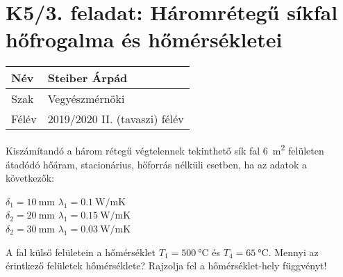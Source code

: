 
\section*{K5/3. feladat: Háromrétegű síkfal hőfrogalma és hőmérsékletei}

\begin{tabular}{ | p{2cm} | p{14cm} | } 
	\hline
	Név & Steiber Árpád \\ 
	\hline
	Szak & Vegyészmérnöki \\ 
	\hline
	Félév & 2019/2020 II. (tavaszi) félév \\ 
	\hline
\end{tabular}
\vspace{0.5cm}

\noindent Kiszámítandó a három rétegű végtelennek tekinthető sík fal \SI{6}{\meter\squared} felületen átadódó hőáram, stacionárius, hőforrás nélküli esetben, ha az adatok a következők:
\begin{center}
	$\delta_1 = \SI{10}{\milli\meter}$ $\lambda_1 = \SI{0.1}{\watt\per\meter\kelvin}$ \\
	\vspace{2mm}
	$\delta_2 = \SI{20}{\milli\meter}$ $\lambda_1 = \SI{0.15}{\watt\per\meter\kelvin}$ \\
	\vspace{2mm}
	$\delta_2 = \SI{30}{\milli\meter}$ $\lambda_1 = \SI{0.03}{\watt\per\meter\kelvin}$ \\
\end{center}

\vspace{2mm}

 A fal külső felületein a hőmérséklet $T_1 = \SI{500}{\celsius}$ és $T_4 = \SI{65}{\celsius}$. Mennyi az érintkező felületek hőmérséklete? Rajzolja fel a hőmérséklet-hely függvényt!
 
\vspace{2mm}


